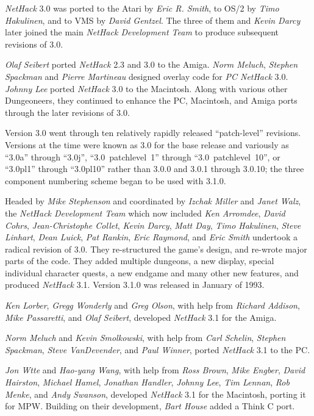 \documentclass[titlepage]{article}
\begin{document}
\medskip
\noindent \textit{NetHack} 3.0 was ported to the Atari by \textit{Eric R. Smith}, to OS/2 by
\textit{Timo Hakulinen}, and to VMS by \textit{David Gentzel}.  The three of them
and \textit{Kevin Darcy} later joined the main \textit{NetHack Development Team} to produce
subsequent revisions of 3.0.

\medskip
\noindent \textit{Olaf Seibert} ported \textit{NetHack} 2.3 and 3.0 to the Amiga.  {\it
Norm Meluch}, \textit{Stephen Spackman} and \textit{Pierre Martineau} designed
overlay code for \textit{PC NetHack} 3.0.  \textit{Johnny Lee} ported {\it
NetHack} 3.0 to the Macintosh.  Along with various other Dungeoneers, they
continued to enhance the PC, Macintosh, and Amiga ports through the later
revisions of 3.0.

Version 3.0 went through ten relatively rapidly released ``patch-level''
revisions.
Versions at the time were known as 3.0 for the base release and variously
as ``3.0a'' through ``3.0j'',
``3.0~patchlevel~1'' through ``3.0~patchlevel~10'',
or ``3.0pl1'' through ``3.0pl10''
rather than 3.0.0 and 3.0.1 through 3.0.10;
the three component numbering scheme began to be used with 3.1.0.

\medskip
\noindent Headed by \textit{Mike Stephenson} and coordinated by \textit{Izchak Miller}
and \textit{Janet Walz}, the \textit{NetHack Development Team} which now included
\textit{Ken Arromdee},
\textit{David Cohrs}, \textit{Jean-Christophe Collet}, \textit{Kevin Darcy},
\textit{Matt Day}, \textit{Timo Hakulinen}, \textit{Steve Linhart}, \textit{Dean Luick},
\textit{Pat Rankin}, \textit{Eric Raymond}, and \textit{Eric Smith} undertook a
radical revision of 3.0.
They re-structured the game's design, and re-wrote major
parts of the code.
They added multiple dungeons, a new display, special
individual character quests, a new endgame and many other new features, and
produced \textit{NetHack} 3.1.
Version 3.1.0 was released in January of 1993.

\medskip
\noindent \textit{Ken Lorber}, \textit{Gregg Wonderly} and \textit{Greg Olson}, with help
from \textit{Richard Addison}, \textit{Mike Passaretti}, and \textit{Olaf Seibert},
developed \textit{NetHack} 3.1 for the Amiga.

\medskip
\noindent \textit{Norm Meluch} and \textit{Kevin Smolkowski}, with help from
\textit{Carl Schelin}, \textit{Stephen Spackman}, \textit{Steve VanDevender},
and \textit{Paul Winner}, ported \textit{NetHack} 3.1 to the PC.

\medskip
\noindent \textit{Jon W\textbraceleft tte} and \textit{Hao-yang Wang},
with help from \textit{Ross Brown}, \textit{Mike Engber}, \textit{David Hairston},
\textit{Michael Hamel}, \textit{Jonathan Handler}, \textit{Johnny Lee},
\textit{Tim Lennan}, \textit{Rob Menke}, and \textit{Andy Swanson},
developed \textit{NetHack} 3.1 for the Macintosh, porting it for MPW.
Building on their development, \textit{Bart House} added a Think C port.
\end{document}
